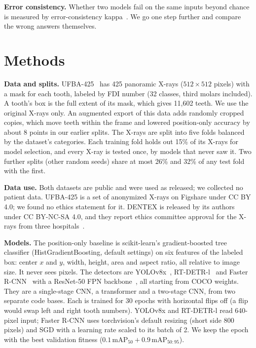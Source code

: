 \documentclass[runningheads]{llncs}
\begin{document}
\textbf{Error consistency.} Whether two models fail on the same inputs
beyond chance is measured by error-consistency
kappa~\cite{geirhos2020consistency}. We go one step further and compare the
wrong answers themselves.

\section{Methods}

\textbf{Data and splits.} UFBA-425~\cite{budagam2025ufba} has 425 panoramic
X-rays ($512\times512$ pixels) with a mask for each tooth, labeled by FDI
number (32 classes, third molars included). A tooth's box is the full extent
of its mask, which gives 11,602 teeth. We use the original X-rays only. An
augmented export of this data adds randomly cropped copies, which move teeth
within the frame and lowered position-only accuracy by about 8 points in our
earlier splits. The X-rays are split into five folds balanced by the
dataset's categories. Each training fold holds out 15\% of its X-rays for
model selection, and every X-ray is tested once, by models that never saw
it. Two further splits (other random seeds) share at most 26\% and 32\% of any test fold with the first.

\textbf{Data use.} Both datasets are public and were used as released; we
collected no patient data. UFBA-425 is a set of anonymized X-rays on Figshare
under CC BY 4.0; we found no ethics statement for it. DENTEX is released by
its authors under CC BY-NC-SA 4.0, and they report ethics committee approval
for the X-rays from three hospitals~\cite{hamamci2023dentex}.

\textbf{Models.} The position-only baseline is scikit-learn's gradient-boosted
tree classifier (Hist\-Gradient\-Boosting, default settings) on six features of
the labeled box: center $x$ and $y$, width, height, area and aspect ratio,
all relative to image size. It never sees pixels. The detectors are
YOLOv8x~\cite{jocher2023yolov8}, RT-DETR-l~\cite{zhao2024rtdetr} and Faster
R-CNN~\cite{ren2015faster} with a ResNet-50 FPN
backbone~\cite{li2021benchmarking}, all starting from COCO weights. They are
a single-stage CNN, a transformer and a two-stage CNN, from two separate code
bases. Each is trained for 30 epochs with horizontal flips off (a flip would
swap left and right tooth numbers). YOLOv8x and RT-DETR-l read 640-pixel
input; Faster R-CNN uses torchvision's default resizing (short side 800
pixels) and SGD with a learning rate scaled to its batch of 2. We keep the
epoch with the best validation fitness
($0.1\,\mathrm{mAP}_{50} + 0.9\,\mathrm{mAP}_{50:95}$).
\end{document}
